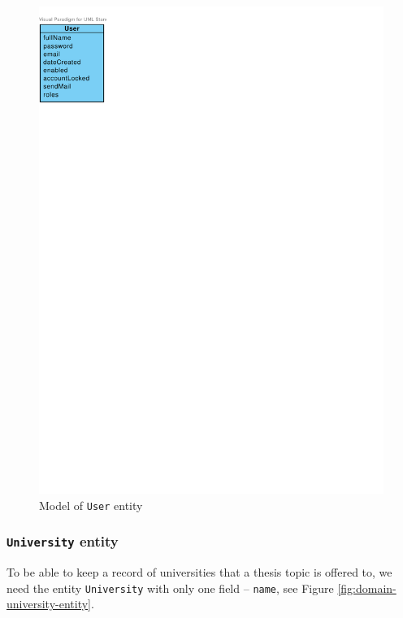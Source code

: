 \begin{figure}[h]
    \centering
        \includegraphics[trim=0 675 480 30, clip, keepaspectratio, scale=0.8]{./images/domain-user-entity.pdf}
    \caption{Model of \texttt{User} entity}
    \label{fig:domain-user-entity}
\end{figure}

\subsubsection{\texttt{University} entity}

To be able to keep a record of universities that a thesis topic is offered to, we need the entity \texttt{University} with only one field -- \texttt{name}, see Figure \ref{fig:domain-university-entity}.


